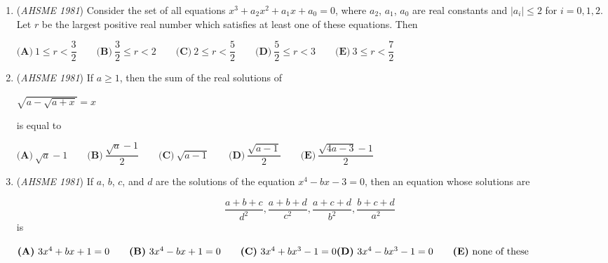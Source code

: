 \begin{enumerate}
$\textbf{(A)}\ \dfrac {2 - \sqrt {3}}{3}\qquad \textbf{(B)}\ \dfrac {2\sqrt {3} - 3}{3}\qquad \textbf{(C)}\ 7\sqrt {3}-12\qquad \textbf{(D)}\ 3\sqrt {3}-5\qquad\\ \textbf{(E)}\ \dfrac {9-5\sqrt {3}}{3}$


	\item (\textit{AHSME 1981}) Consider the set of all equations $x^3 + a_2x^2 + a_1x + a_0 = 0$, where $a_2$, $a_1$, $a_0$ are real constants and $|a_i| \leq 2$ for $i = 0,1,2$. Let $r$ be the largest positive real number which satisfies at least one of these equations. Then


 $\textbf{(A)}\ 1 \leq r < \dfrac{3}{2}\qquad \textbf{(B)}\ \dfrac{3}{2} \leq r < 2\qquad \textbf{(C)}\ 2 \leq r < \dfrac{5}{2}\qquad \textbf{(D)}\ \dfrac{5}{2} \leq r < 3\qquad \textbf{(E)}\ 3 \leq r < \dfrac{7}{2}$


	\item (\textit{AHSME 1981}) If $a \geq 1$, then the sum of the real solutions of 


 $\sqrt{a - \sqrt{a + x}} = x$


 is equal to 


 $\textbf{(A)}\ \sqrt{a} - 1\qquad \textbf{(B)}\ \dfrac{\sqrt{a}- 1}{2}\qquad \textbf{(C)}\ \sqrt{a - 1}\qquad \textbf{(D)}\ \dfrac{\sqrt{a - 1}}{2}\qquad \textbf{(E)}\ \dfrac{\sqrt{4a- 3} - 1}{2}$


	\item (\textit{AHSME 1981}) If $a$, $b$, $c$, and $d$ are the solutions of the equation $x^4 - bx - 3 = 0$, then an equation whose solutions are 

 \[\dfrac {a + b + c}{d^2}, \dfrac {a + b + d}{c^2}, \dfrac {a + c + d}{b^2}, \dfrac {b + c + d}{a^2}\]is


 $\textbf{(A)}\ 3x^4 + bx + 1 = 0\qquad \textbf{(B)}\ 3x^4 - bx + 1 = 0\qquad \textbf{(C)}\ 3x^4 + bx^3 - 1 = 0\qquad \\\textbf{(D)}\ 3x^4 - bx^3 - 1 = 0\qquad  \textbf{(E)}\ \text{none of these}$


\end{enumerate}